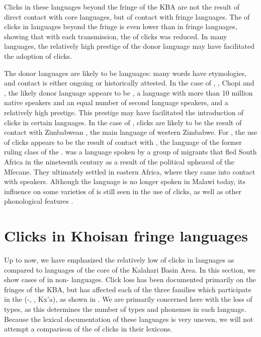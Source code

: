 \documentclass[output=paper
,newtxmath
,modfonts
,nonflat]{langsci/langscibook}
\begin{document}
Clicks in these  languages beyond the fringe of the KBA are not the result of direct contact with core languages, but of contact with fringe languages. The  of clicks in  languages beyond the fringe is even lower than in fringe languages, showing that with each transmission, the  of clicks was reduced. In many languages, the relatively high prestige of the donor language may have facilitated the adoption of clicks. 

The donor languages are likely to be  languages: many  words have  etymologies, and contact is either ongoing or historically attested. In the case of , , Chopi and , the likely donor language appears to be , a language with more than 10 million native speakers and an equal number of second language speakers, and a relatively high prestige. This prestige may have facilitated the introduction of clicks in certain languages. In the case of , clicks are likely to be the result of contact with Zimbabwean , the main language of western Zimbabwe. For , the use of clicks appears to be the result of contact with , the language of the former ruling class of the .  was a  language spoken by a group of migrants that fled South Africa in the nineteenth century as a result of the political upheaval of the Mfecane. They ultimately settled in eastern Africa, where they came into contact with  speakers. Although the  language is no longer spoken in Malawi today, its influence on some varieties of  is still seen in the use of clicks, as well as other phonological features \citep{Moyo1995}. 

\section{Clicks in Khoisan fringe languages}\label{sec:sands:5}

Up to now, we have emphasized the relatively low  of clicks in  languages as compared to languages of the core of the Kalahari Basin Area. In this section, we show cases of  in non- languages. Click loss has been documented primarily on the fringes of the KBA, but has affected each of the three families which participate in the  (-, , Kx'a), as shown in . We are primarily concerned here with the loss of  types, as this determines the number of  types and  phonemes in each language. Because the lexical documentation of these languages is very uneven, we will not attempt a comparison of the  of clicks in their lexicons. 
\end{document}
